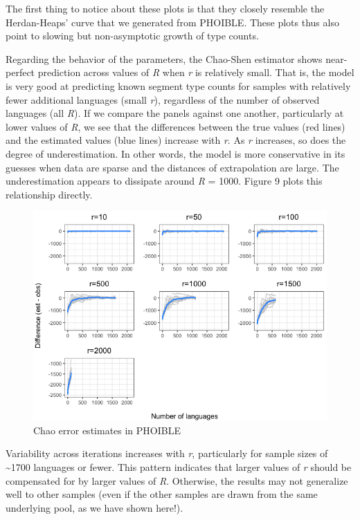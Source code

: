 \documentclass[
]{article}
\begin{document}
The first thing to notice about these plots is that they closely
resemble the Herdan-Heaps' curve that we generated from PHOIBLE. These
plots thus also point to slowing but non-asymptotic growth of type
counts.

Regarding the behavior of the parameters, the Chao-Shen estimator shows
near-perfect prediction across values of \emph{R} when \emph{r} is
relatively small. That is, the model is very good at predicting known
segment type counts for samples with relatively fewer additional
languages (small \emph{r}), regardless of the number of observed
languages (all \emph{R}). If we compare the panels against one another,
particularly at lower values of \emph{R}, we see that the differences
between the true values (red lines) and the estimated values (blue
lines) increase with \emph{r}. As \emph{r} increases, so does the degree
of underestimation. In other words, the model is more conservative in
its guesses when data are sparse and the distances of extrapolation are
large. The underestimation appears to dissipate around \emph{R} = 1000.
Figure 9 plots this relationship directly.

\begin{figure}

{\centering \includegraphics[width=0.8\linewidth]{README_files/figure-gfm/chao_error_estimates-1} 

}

\caption{\label{fig:chao_error_estimates}Chao error estimates in PHOIBLE}\label{fig:chao_error_estimates}
\end{figure}

Variability across iterations increases with \emph{r}, particularly for
sample sizes of \textasciitilde1700 languages or fewer. This pattern
indicates that larger values of \emph{r} should be compensated for by
larger values of \emph{R}. Otherwise, the results may not generalize
well to other samples (even if the other samples are drawn from the same
underlying pool, as we have shown here!).
\end{document}
